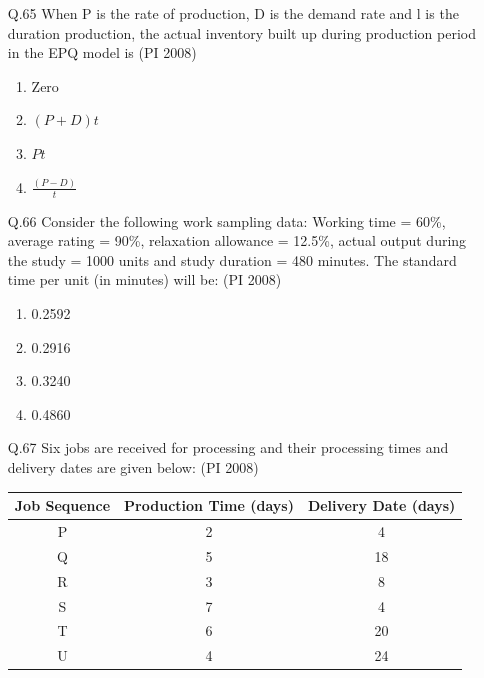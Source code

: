\documentclass[journal,12pt,onecolumn]{IEEEtran}
\theoremstyle{remark}
\begin{document}
\begin{enumerate}
\noindent
(A) P-4, Q-3, R-2, S-1 \\
(B) P-2, Q-4, R-3, S-1 \\
(C) P-2, Q-1, R-4, S-3 \\
(D) P-4, Q-1, R-2, S-3

\vspace{0.5cm}
\item[\textnormal{Q.65}]
When P is the rate of production, D is the demand rate and l is the duration production, the actual inventory built up during production period in the EPQ model is 
\hfill{(PI 2008)}
\begin{multicols}{4}
    \begin{enumerate}[label=(\Alph*)]
\item Zero
\item $(P+D)t$
\item $Pt$
\item $\frac{(P-D)}{t}$
    
    \end{enumerate}
\end{multicols}
\vspace{1cm}

\item[\textnormal{Q.66}]
Consider the following work sampling data:  
Working time = 60\%, average rating = 90\%, relaxation allowance = 12.5\%,  
actual output during the study = 1000 units and study duration = 480 minutes.  
The standard time per unit (in minutes) will be:
\hfill{(PI 2008)}

\begin{multicols}{4}
    \begin{enumerate}[label=(\Alph*)]
\item  0.2592
\item  0.2916
\item  0.3240 
\item  0.4860
 \end{enumerate}
\end{multicols}
\vspace{1cm}
\vspace{0.5cm}
\item[\textnormal{Q.67}]
Six jobs are received for processing and their processing times and delivery dates are given below:
\hfill{(PI 2008)}
\begin{center}
\begin{tabular}{|c|c|c|}
\hline
\textbf{Job Sequence} & \textbf{Production Time (days)} & \textbf{Delivery Date (days)} \\
\hline
P & 2 & 4 \\
Q & 5 & 18 \\
R & 3 & 8 \\
S & 7 & 4 \\
T & 6 & 20 \\
U & 4 & 24 \\
\hline
\end{tabular}
\end{center}


\end{enumerate}
\end{document}
